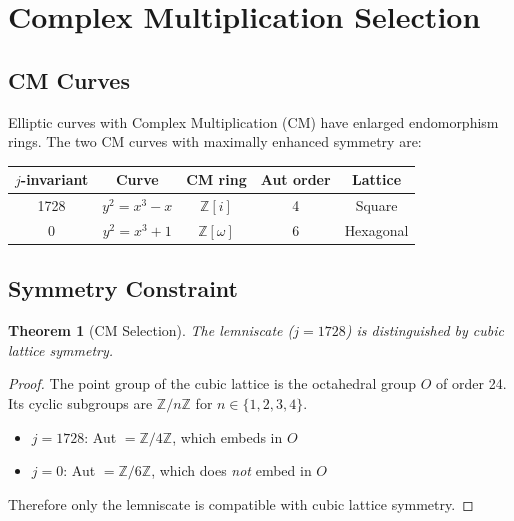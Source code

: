 \documentclass[11pt,a4paper]{article}
\newtheorem{theorem}{Theorem}[section]
\theoremstyle{definition}
\theoremstyle{remark}
\begin{document}
\section{Complex Multiplication Selection}

\subsection{CM Curves}

Elliptic curves with Complex Multiplication (CM) have enlarged endomorphism rings. The two CM curves with maximally enhanced symmetry are:

\begin{center}
\begin{tabular}{ccccc}
\toprule
$j$-invariant & Curve & CM ring & Aut order & Lattice \\
\midrule
1728 & $y^2 = x^3 - x$ & $\mathbb{Z}[i]$ & 4 & Square \\
0 & $y^2 = x^3 + 1$ & $\mathbb{Z}[\omega]$ & 6 & Hexagonal \\
\bottomrule
\end{tabular}
\end{center}

\subsection{Symmetry Constraint}

\begin{theorem}[CM Selection]
The lemniscate ($j = 1728$) is distinguished by cubic lattice symmetry.
\end{theorem}

\begin{proof}
The point group of the cubic lattice is the octahedral group $O$ of order 24. Its cyclic subgroups are $\mathbb{Z}/n\mathbb{Z}$ for $n \in \{1, 2, 3, 4\}$.

\begin{itemize}
    \item $j = 1728$: Aut $= \mathbb{Z}/4\mathbb{Z}$, which embeds in $O$
    \item $j = 0$: Aut $= \mathbb{Z}/6\mathbb{Z}$, which does \emph{not} embed in $O$
\end{itemize}

Therefore only the lemniscate is compatible with cubic lattice symmetry.
\end{proof}
\end{document}
